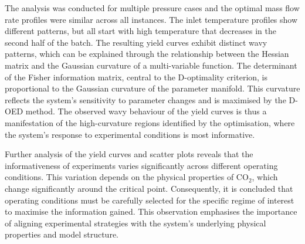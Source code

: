 \documentclass[a4paper,fleqn]{cas-dc}
\begin{document}
		The analysis was conducted for multiple pressure cases and the optimal mass flow rate profiles were similar across all instances. The inlet temperature profiles show different patterns, but all start with high temperature that decreases in	the second half of the batch. The resulting yield curves exhibit distinct wavy patterns, which can be explained through	the relationship between the Hessian matrix and the Gaussian curvature of a multi-variable function. The determinant of the Fisher information matrix, central to the D-optimality criterion, is proportional to the Gaussian curvature of the parameter manifold. This curvature reflects the system’s sensitivity to parameter changes and is maximised by the D-OED method. The observed wavy behaviour of the yield curves is thus a manifestation of the high-curvature regions identified by the optimisation, where the system’s response to experimental conditions is most informative.
		
		Further analysis of the yield curves and scatter plots reveals that the informativeness of experiments varies significantly across different operating conditions. This variation depends on the physical properties of CO$_2$, which change	significantly around the critical point. Consequently, it is concluded that operating conditions must be carefully selected for the specific regime of interest to maximise the information gained. This observation emphasises the importance of aligning experimental strategies with the system’s underlying physical properties and model structure.

%



%

\end{document}
